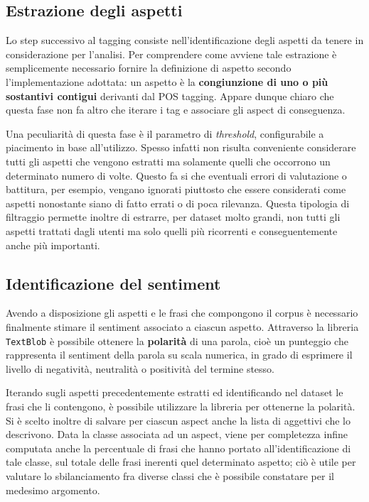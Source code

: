 \documentclass[hidelinks, 12pt]{article}
\begin{document}
\subsection{Estrazione degli aspetti}

Lo step successivo al tagging consiste nell'identificazione degli aspetti da tenere in considerazione per l'analisi. Per comprendere come avviene tale estrazione è semplicemente necessario fornire la definizione di aspetto secondo l'implementazione adottata: un aspetto è la \textbf{congiunzione di uno o più sostantivi contigui} derivanti dal POS tagging. Appare dunque chiaro che questa fase non fa altro che iterare i tag e associare gli aspect di conseguenza.

Una peculiarità di questa fase è il parametro di \textit{threshold}, configurabile a piacimento in base all'utilizzo. Spesso infatti non risulta conveniente considerare tutti gli aspetti che vengono estratti ma solamente quelli che occorrono un determinato numero di volte. Questo fa si che eventuali errori di valutazione o battitura, per esempio, vengano ignorati piuttosto che essere considerati come aspetti nonostante siano di fatto errati o di poca rilevanza. Questa tipologia di filtraggio permette inoltre di estrarre, per dataset molto grandi, non tutti gli aspetti trattati dagli utenti ma solo quelli più ricorrenti e conseguentemente anche più importanti.



\subsection{Identificazione del sentiment}

Avendo a disposizione gli aspetti e le frasi che compongono il corpus è necessario finalmente stimare il sentiment associato a ciascun aspetto. Attraverso la libreria \texttt{TextBlob} \cite{site:textblob} è possibile ottenere la \textbf{polarità} di una parola, cioè un punteggio che rappresenta il sentiment della parola su scala numerica, in grado di esprimere il livello di negatività, neutralità o positività del termine stesso.

Iterando sugli aspetti precedentemente estratti ed identificando nel dataset le frasi che li contengono, è possibile utilizzare la libreria per ottenerne la polarità. Si è scelto inoltre di salvare per ciascun aspect anche la lista di aggettivi che lo descrivono. Data la classe associata ad un aspect, viene per completezza infine computata anche la percentuale di frasi che hanno portato all'identificazione di tale classe, sul totale delle frasi inerenti quel determinato aspetto; ciò è utile per valutare lo sbilanciamento fra diverse classi che è possibile constatare per il medesimo argomento.
\end{document}
